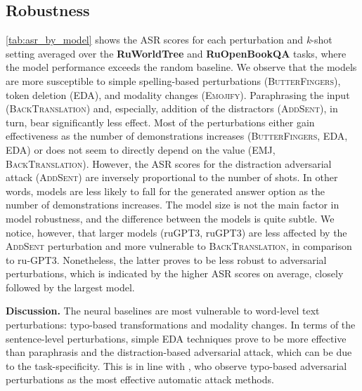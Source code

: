 \documentclass[11pt]{article}
\begin{document}
\subsection{Robustness}
\autoref{tab:asr_by_model} shows the ASR scores for each perturbation and \textit{k}-shot setting averaged over the \textbf{RuWorldTree} and \textbf{RuOpenBookQA} tasks, where the model performance exceeds the random baseline. We observe that the models are more susceptible to simple spelling-based perturbations (\textsc{ButterFingers}), token deletion (\textsc{EDA}), and modality changes (\textsc{Emojify}). Paraphrasing the input (\textsc{BackTranslation}) and, especially, addition of the distractors (\textsc{AddSent}), in turn, bear significantly less effect. Most of the perturbations either gain effectiveness as the number of demonstrations increases (\textsc{ButterFingers}, \textsc{EDA}, \textsc{EDA}) or does not seem to directly depend on the  value (\textsc{EMJ}, \textsc{BackTranslation}). However, the ASR scores for the distraction adversarial attack (\textsc{AddSent}) are inversely proportional to the number of shots. In other words, models are less likely to fall for the generated answer option as the number of demonstrations increases. The model size is not the main factor in model robustness, and the difference between the models is quite subtle. We notice, however, that larger models (ruGPT3, ruGPT3) are less affected by the \textsc{AddSent} perturbation and more vulnerable to \textsc{BackTranslation}, in comparison to ru-GPT3. Nonetheless, the latter proves to be less robust to adversarial perturbations, which is indicated by the higher ASR scores on average, closely followed by the largest model. 

\vspace{0.1em} \noindent\textbf{Discussion.} The neural baselines are most vulnerable to word-level text perturbations: typo-based transformations and modality changes. In terms of the sentence-level perturbations, simple EDA techniques prove to be more effective than paraphrasis and the distraction-based adversarial attack, which can be due to the task-specificity. This is in line with \citet{wang2021adversarial}, who observe typo-based adversarial perturbations as the most effective automatic attack methods.
\end{document}
